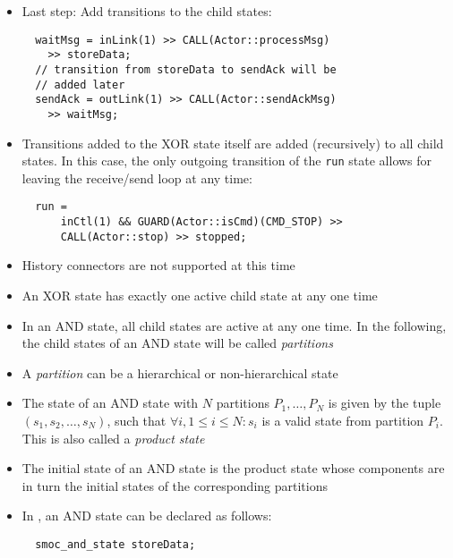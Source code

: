 \begin{frame}[fragile=singleslide]
\begin{itemize}
\item Last step: Add transitions to the child states:
\begin{lstlisting}
  waitMsg = inLink(1) >> CALL(Actor::processMsg)
    >> storeData;
  // transition from storeData to sendAck will be
  // added later
  sendAck = outLink(1) >> CALL(Actor::sendAckMsg)
    >> waitMsg;
\end{lstlisting}
\item Transitions added to the XOR state itself are added (recursively) to all child states. In this case, the only outgoing transition of the \texttt{run} state allows for leaving the receive/send loop at any time: 
\begin{lstlisting}
  run =
      inCtl(1) && GUARD(Actor::isCmd)(CMD_STOP) >>
      CALL(Actor::stop) >> stopped;
\end{lstlisting}
\item History connectors are not supported at this time
\end{itemize}
\end{frame}

\begin{frame}[fragile=singleslide]
\begin{itemize}
\item An XOR state has exactly one active child state at any one time
\item In an AND state, all child states are active at any one time. In the following, the child states of an AND state will be called \emph{partitions}
\item A \emph{partition} can be a hierarchical or non-hierarchical state
\item The state of an AND state with $N$ partitions $P_1,\ldots,P_N$ is given by the tuple $(s_1,s_2,\ldots,s_N)$, such that $\forall i, 1 \leq i \leq N: s_i $ is a valid state from partition $P_i$. This is also called a \emph{product state}
\item The initial state of an AND state is the product state whose components are in turn the initial states of the corresponding partitions
\item In \SysteMoC, an AND state can be declared as follows: 
\begin{lstlisting}
  smoc_and_state storeData;
\end{lstlisting}
\end{itemize}
\end{frame}

